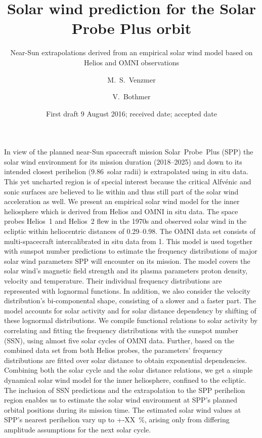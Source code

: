 
\title{Solar wind prediction for the Solar Probe Plus orbit}
\subtitle{Near-Sun extrapolations derived from an empirical solar wind model based on Helios and OMNI observations}

\author{M.~S.~Venzmer
\and V.~Bothmer}


\date{First draft 9 August 2016; received date; accepted date }

\abstract
{In view of the planned near-Sun spacecraft mission Solar~Probe~Plus (SPP) the solar wind environment for its mission duration (2018--2025) and down to its intended closest perihelion (\num{9.86}~solar radii) is extrapolated using in situ data. This yet uncharted region is of special interest because the critical Alfvénic and sonic surfaces are believed to lie within and thus still part of the solar wind acceleration as well.}	%
{We present an empirical solar wind model for the inner heliosphere which is derived from Helios and OMNI in situ data. The space probes Helios~1 and Helios~2 flew in the 1970s and observed solar wind in the ecliptic within heliocentric distances of \SIrange{0.29}{0.98}{\au}. The OMNI data set consists of multi-spacecraft intercalibrated in situ data from \SI{1}{\au}. This model is used together with sunspot number predictions to estimate the frequency distributions of major solar wind parameters SPP will encounter on its mission.}	%
{The model covers the solar wind's magnetic field strength and its plasma parameters proton density, velocity and temperature.
Their individual frequency distributions are represented with lognormal functions. In addition, we also consider the velocity distribution's bi-componental shape, consisting of a slower and a faster part. The model accounts for solar activity and for solar distance dependency by shifting of these lognormal distributions. We compile functional relations to solar activity by correlating and fitting the frequency distributions with the sunspot number (SSN), using almost five solar cycles of OMNI data. Further, based on the combined data set from both Helios probes, the parameters' frequency distributions are fitted over solar distance to obtain exponential dependencies. Combining both the solar cycle and the solar distance relations, we get a simple dynamical solar wind model for the inner heliosphere, confined to the ecliptic.}	%
{The inclusion of SSN predictions and the extrapolation to the SPP perihelion region enables us to estimate the solar wind environment at SPP's planned orbital positions during its mission time. The estimated solar wind values at SPP's nearest perihelion vary up to +-XX~\%, arising only from differing amplitude assumptions for the next solar cycle.}	%
{}	%

